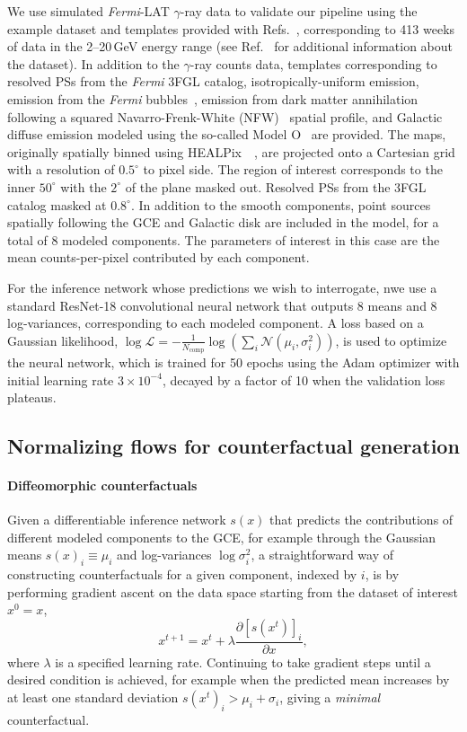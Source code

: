 \documentclass[nohyperref]{article}
\theoremstyle{plain}
\theoremstyle{definition}
\theoremstyle{remark}
\begin{document}
We use simulated \emph{Fermi}-LAT $\gamma$-ray data to validate our pipeline using the example dataset and templates provided with Refs.~\cite{Mishra-Sharma:2016gis,Buschmann:2020adf}, corresponding to 413 weeks of data in the 2--20\,GeV energy range (see Ref.~\cite{Mishra-Sharma:2016gis} for additional information about the dataset). In addition to the $\gamma$-ray counts data, templates corresponding to resolved PSs from the \emph{Fermi} 3FGL catalog, isotropically-uniform emission, emission from the \emph{Fermi} bubbles~\cite{Su:2010qj}, emission from dark matter annihilation following a squared Navarro-Frenk-White (NFW)~\cite{Navarro:1995iw,Navarro:1996gj} spatial profile, and Galactic diffuse emission modeled using the so-called Model O~\cite{Buschmann:2020adf} are provided. The maps, originally spatially binned using HEALPix~~\cite{Gorski:2004by}, are projected onto a Cartesian grid with a resolution of $0.5^\circ$ to pixel side. The region of interest corresponds to the inner $50^{\circ}$ with the $2^{\circ}$ of the plane masked out. Resolved PSs from the 3FGL catalog masked at $0.8^\circ$. In addition to the smooth components, point sources spatially following the GCE and Galactic disk are included in the model, for a total of 8 modeled components. The parameters of interest in this case are the mean counts-per-pixel contributed by each component.

For the inference network whose predictions we wish to interrogate, nwe use a standard ResNet-18 convolutional neural network that outputs 8 means and 8 log-variances, corresponding to each modeled component. A loss based on a Gaussian likelihood, $\log \mathcal L = -\frac{1}{N_\mathrm{comp}}\log\left(\sum_i \mathcal N(\mu_i, \sigma_i^2)\right)$, is used to optimize the neural network, which is trained for 50 epochs using the Adam optimizer with initial learning rate $3\times 10^{-4}$, decayed by a factor of 10 when the validation loss plateaus.

\subsection{Normalizing flows for counterfactual generation}

\paragraph*{Diffeomorphic counterfactuals}
Given a differentiable inference network $s(x)$ that predicts the contributions of different modeled components to the GCE, for example through the Gaussian means $s(x)_i \equiv \mu_i$ and log-variances $\log\sigma_i^2$, a straightforward way of constructing counterfactuals for a given component, indexed by $i$, is by performing gradient ascent on the data space starting from the dataset of interest $x^{0} = x$,
\begin{equation}
    x^{t+1}=x^{t}+\lambda \frac{\partial \left[s(x^{t})\right]_i}{\partial x},
\end{equation}
where $\lambda$ is a specified learning rate. Continuing to take gradient steps until a desired condition is achieved, for example when the predicted mean increases by at least one standard deviation $s(x^{t})_i > \mu_i + \sigma_i$, giving a \emph{minimal} counterfactual.
\end{document}
